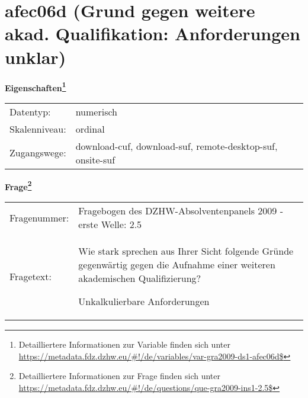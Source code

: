 
    \setcounter{footnote}{0}

    \vspace*{-1.8cm}
	\section{afec06d (Grund gegen weitere akad. Qualifikation: Anforderungen unklar)}
	\label{section:afec06d}



    \vspace*{0.5cm}
    \noindent\textbf{Eigenschaften\footnote{Detailliertere Informationen zur Variable finden sich unter
		\url{https://metadata.fdz.dzhw.eu/\#!/de/variables/var-gra2009-ds1-afec06d$}}}\\
	\begin{tabularx}{\hsize}{@{}lX}
	Datentyp: & numerisch \\
	Skalenniveau: & ordinal \\
	Zugangswege: &
	  download-cuf, 
	  download-suf, 
	  remote-desktop-suf, 
	  onsite-suf
 \\
    \end{tabularx}



				\vspace*{0.5cm}
                \noindent\textbf{Frage\footnote{Detailliertere Informationen zur Frage finden sich unter
		              \url{https://metadata.fdz.dzhw.eu/\#!/de/questions/que-gra2009-ins1-2.5$}}}\\
				\begin{tabularx}{\hsize}{@{}lX}
					Fragenummer: &
					  Fragebogen des DZHW-Absolventenpanels 2009 - erste Welle:
					  2.5
 \\
					Fragetext: & Wie stark sprechen aus Ihrer Sicht folgende Gründe gegenwärtig gegen die Aufnahme einer weiteren akademischen Qualifizierung?\par  Unkalkulierbare Anforderungen \\
				\end{tabularx}





